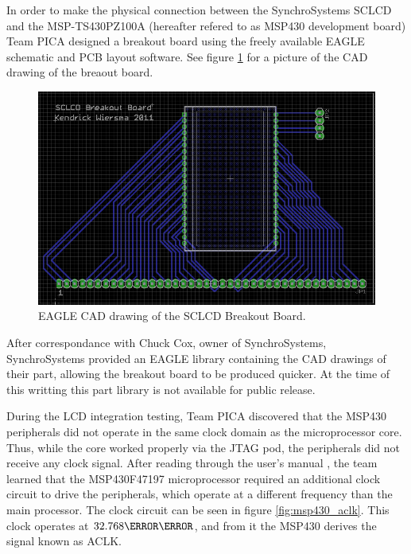 In order to make the physical connection between the SynchroSystems SCLCD and the MSP-TS430PZ100A (hereafter refered to as MSP430 development board) Team PICA designed a breakout board using the freely available EAGLE schematic and \ac{PCB} layout software. See figure \ref{fig:sclcd_breakout_board} for a picture of the \ac{CAD} drawing of the breaout board.
\begin{figure}[htbp]
\begin{center}
\includegraphics[width=5in]{includes/SCLCD_Breakout_Board}
\caption{EAGLE \ac{CAD} drawing of the SCLCD Breakout Board.}
\label{fig:sclcd_breakout_board}
\end{center}
\end{figure}
After correspondance with Chuck Cox, owner of SynchroSystems, SynchroSystems provided an EAGLE library containing the \ac{CAD} drawings of their part, allowing the breakout board to be produced quicker. At the time of this writting this part library is not available for public release.

During the \ac{LCD} integration testing, Team PICA discovered that the MSP430 peripherals did not operate in the same clock domain as the microprocessor core. Thus, while the core worked properly via the \ac{JTAG} pod, the peripherals did not receive any clock signal. After reading through the user's manual \cite{MSP-TS430PZ100A_users_guide}, the team learned that the MSP430F47197 microprocessor required an additional clock circuit to drive the peripherals, which operate at a different frequency than the main processor. The clock circuit can be seen in figure \ref{fig:msp430_aclk}. This clock operates at $32.768\kilo\hertz$, and from it the MSP430 derives the signal known as ACLK.

